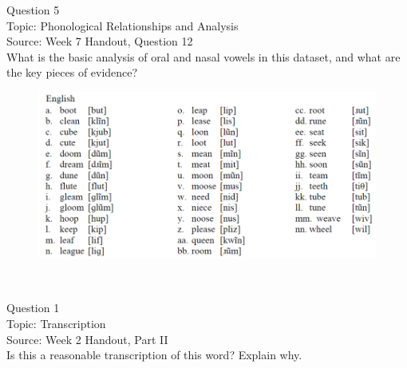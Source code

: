 \documentclass[12pt]{article}
\begin{document}
\newpage

{\large Question 5}\\

Topic: Phonological Relationships and Analysis\\
Source: Week 7 Handout, Question 12\\

What is the basic analysis of oral and nasal vowels in this dataset, and what are the key pieces of evidence?\\

\begin{figure}[H]
\includegraphics{../images/english12.png}
\end{figure}

\newpage

\begin{center}
\textbf{{\color{red}{\HUGE END OF EXAM}}}\\

\end{center}
\newpage

\begin{center}
\textbf{{\color{blue}{\HUGE START OF EXAM\\}}}

\textbf{{\color{blue}{\HUGE Student ID: 83639\\}}}

\textbf{{\color{blue}{\HUGE \\}}}

\end{center}
\newpage

{\large Question 1}\\

Topic: Transcription\\
Source: Week 2 Handout, Part II\\

Is this a reasonable transcription of this word? Explain why.\\
\end{document}

